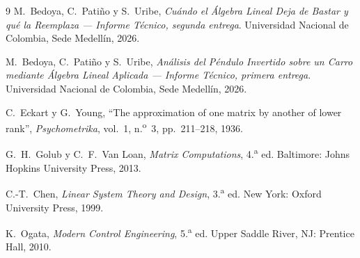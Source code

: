 \documentclass[11pt,letterpaper]{article}
\begin{document}
\begin{thebibliography}{9}
\small
{}
M.~Bedoya, C.~Patiño y S.~Uribe, \emph{Cuándo el Álgebra Lineal Deja de Bastar y
qué la Reemplaza --- Informe Técnico, segunda entrega}. Universidad Nacional de
Colombia, Sede Medellín, 2026.

M.~Bedoya, C.~Patiño y S.~Uribe, \emph{Análisis del Péndulo Invertido sobre un
Carro mediante Álgebra Lineal Aplicada --- Informe Técnico, primera entrega}.
Universidad Nacional de Colombia, Sede Medellín, 2026.

C.~Eckart y G.~Young, ``The approximation of one matrix by another of lower
rank'', \emph{Psychometrika}, vol.~1, n.\textsuperscript{o}~3, pp.~211--218, 1936.

G.~H.~Golub y C.~F.~Van Loan, \emph{Matrix Computations},
4.\textsuperscript{a} ed. Baltimore: Johns Hopkins University Press, 2013.

C.-T.~Chen, \emph{Linear System Theory and Design}, 3.\textsuperscript{a} ed.
New York: Oxford University Press, 1999.

K.~Ogata, \emph{Modern Control Engineering}, 5.\textsuperscript{a} ed.
Upper Saddle River, NJ: Prentice Hall, 2010.

\end{thebibliography}
\end{document}
